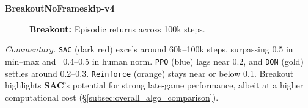 \noindent
\textbf{BreakoutNoFrameskip-v4}
\begin{figure}[htbp]
	\centering
	\quad
	\caption{\textbf{Breakout:} Episodic returns across 100k steps.}
	\label{fig:breakout_comparison_combined}
\end{figure}

\noindent
\emph{Commentary.}
\texttt{SAC} (dark red) excels around 60k--100k steps, surpassing 0.5 in min--max 
and ~0.4--0.5 in human norm. \texttt{PPO} (blue) lags near 0.2, and \texttt{DQN} (gold) 
settles around 0.2--0.3. 
\texttt{Reinforce} (orange) stays near or below 0.1. 
Breakout highlights \textbf{SAC}’s potential for strong late-game performance, 
albeit at a higher computational cost (\S\ref{subsec:overall_algo_comparison}).

\bigskip

